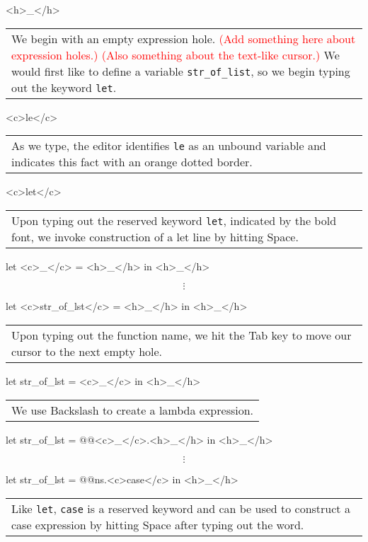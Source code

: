 \documentclass[runningheads]{llncs}
\begin{document}
\noindent
\begin{hazel}
<h>_</h>
\end{hazel}
	\begin{tabular}{|p{\linewidth}}
	We begin with an empty expression hole.
	\textcolor{red}{(Add something here about expression holes.)}
	\textcolor{red}{(Also something about the text-like cursor.)}
	We would first like to define a variable \texttt{str\_of\_list}, so we begin typing out the keyword
	\texttt{let}. 
	\end{tabular}
\begin{hazel}
<c>le</c>
\end{hazel}
	\begin{tabular}{|p{\linewidth}}
	As we type, the editor identifies \texttt{le} as an unbound variable and indicates this
	fact with an orange dotted border.
	\end{tabular}
\begin{hazel}
<c>let</c>
\end{hazel}
	\begin{tabular}{|p{\linewidth}}
	Upon typing out the reserved keyword \texttt{let}, indicated by the bold font, we invoke
	construction of a let line by hitting Space.
	\end{tabular}
\begin{hazel}
let <c>_</c> = <h>_</h> in
<h>_</h>
\end{hazel}
	\[\vdots\]
\begin{hazel}
let <c>str_of_lst</c> = <h>_</h> in
<h>_</h>
\end{hazel}
	\begin{tabular}{|p{\linewidth}}
	Upon typing out the function name, we hit the Tab key to move our cursor to the next empty hole.
	\end{tabular}
\begin{hazel}
let str_of_lst = <c>_</c> in
<h>_</h>
\end{hazel}
	\begin{tabular}{|p{\linewidth}}
	We use Backslash to create a lambda expression.
	\end{tabular}
\begin{hazel}
let str_of_lst = @\lam @<c>_</c>.{<h>_</h>} in
<h>_</h>
\end{hazel}
	\[\vdots\]
\begin{hazel}
let str_of_lst = @\lam @ns.{<c>case</c>} in
<h>_</h>
\end{hazel}
	\begin{tabular}{|p{\linewidth}}
	Like \texttt{let}, \texttt{case} is a reserved keyword and can be used to construct
	a case expression by hitting Space after typing out the word.
	\end{tabular}
\end{document}
